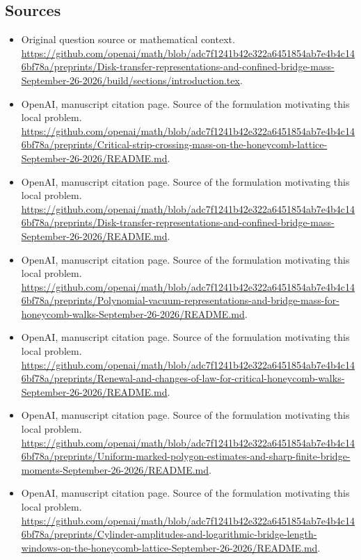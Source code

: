 \documentclass[11pt]{article}
\begin{document}
\subsection{Sources}
\begin{itemize}
\item[S1] Original question source or mathematical context.
\url{https://github.com/openai/math/blob/adc7f1241b42e322a6451854ab7e4b4c146bf78a/preprints/Disk-transfer-representations-and-confined-bridge-mass-September-26-2026/build/sections/introduction.tex}.
\item[S2] OpenAI, manuscript citation page. Source of the formulation motivating this local problem.
\url{https://github.com/openai/math/blob/adc7f1241b42e322a6451854ab7e4b4c146bf78a/preprints/Critical-strip-crossing-mass-on-the-honeycomb-lattice-September-26-2026/README.md}.
\item[S3] OpenAI, manuscript citation page. Source of the formulation motivating this local problem.
\url{https://github.com/openai/math/blob/adc7f1241b42e322a6451854ab7e4b4c146bf78a/preprints/Disk-transfer-representations-and-confined-bridge-mass-September-26-2026/README.md}.
\item[S4] OpenAI, manuscript citation page. Source of the formulation motivating this local problem.
\url{https://github.com/openai/math/blob/adc7f1241b42e322a6451854ab7e4b4c146bf78a/preprints/Polynomial-vacuum-representations-and-bridge-mass-for-honeycomb-walks-September-26-2026/README.md}.
\item[S5] OpenAI, manuscript citation page. Source of the formulation motivating this local problem.
\url{https://github.com/openai/math/blob/adc7f1241b42e322a6451854ab7e4b4c146bf78a/preprints/Renewal-and-changes-of-law-for-critical-honeycomb-walks-September-26-2026/README.md}.
\item[S6] OpenAI, manuscript citation page. Source of the formulation motivating this local problem.
\url{https://github.com/openai/math/blob/adc7f1241b42e322a6451854ab7e4b4c146bf78a/preprints/Uniform-marked-polygon-estimates-and-sharp-finite-bridge-moments-September-26-2026/README.md}.
\item[S7] OpenAI, manuscript citation page. Source of the formulation motivating this local problem.
\url{https://github.com/openai/math/blob/adc7f1241b42e322a6451854ab7e4b4c146bf78a/preprints/Cylinder-amplitudes-and-logarithmic-bridge-length-windows-on-the-honeycomb-lattice-September-26-2026/README.md}.
\end{itemize}
\end{document}
